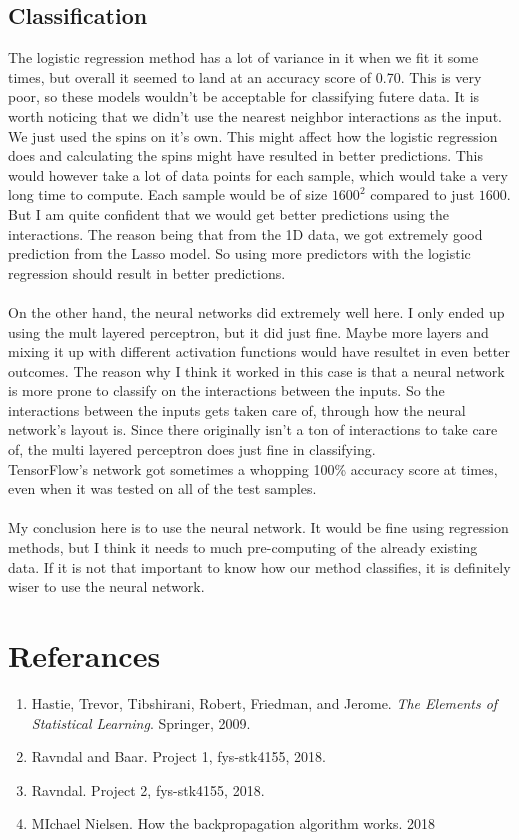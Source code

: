 \documentclass[a4paper,norsk]{article}
\begin{document}
\subsection{Classification}
The logistic regression method has a lot of variance in it when we fit it some times, but overall it seemed to land at an accuracy score of 0.70. This is very poor, so these models wouldn't be acceptable for classifying futere data. It is worth noticing that we didn't use the nearest neighbor interactions as the input. We just used the spins on it's own. This might affect how the logistic regression does and calculating the spins might have resulted in better predictions. This would however take a lot of data points for each sample, which would take a very long time to compute. Each sample would be of size $1600^2$ compared to just $1600$. But I am quite confident that we would get better predictions using the interactions. The reason being that from the 1D data, we got extremely good prediction from the Lasso model. So using more predictors with the logistic regression should result in better predictions.\\
\\
On the other hand, the neural networks did extremely well here. I only ended up using the mult layered perceptron, but it did just fine. Maybe more layers and mixing it up with different activation functions would have resultet in even better outcomes. The reason why I think it worked in this case is that a neural network is more prone to classify on the interactions between the inputs. So the interactions between the inputs gets taken care of, through how the neural network's layout is. Since there originally isn't a ton of interactions to take care of, the multi layered perceptron does just fine in classifying.\\
TensorFlow's network got sometimes a whopping 100\% accuracy score at times, even when it was tested on all of the test samples.\\
\\
My conclusion here is to use the neural network. It would be fine using regression methods, but I think it needs to much pre-computing of the already existing data. If it is not that important to know how our method classifies, it is definitely wiser to use the neural network.

\section*{Referances}
\begin{enumerate}
  \item Hastie, Trevor, Tibshirani, Robert, Friedman, and Jerome. \textit{The Elements of
Statistical Learning}. Springer, 2009.
  \item Ravndal and Baar. Project 1, fys-stk4155, 2018.
  \item Ravndal. Project 2, fys-stk4155, 2018.
  \item MIchael Nielsen. How the backpropagation algorithm works. 2018
\end{enumerate}
\end{document}
